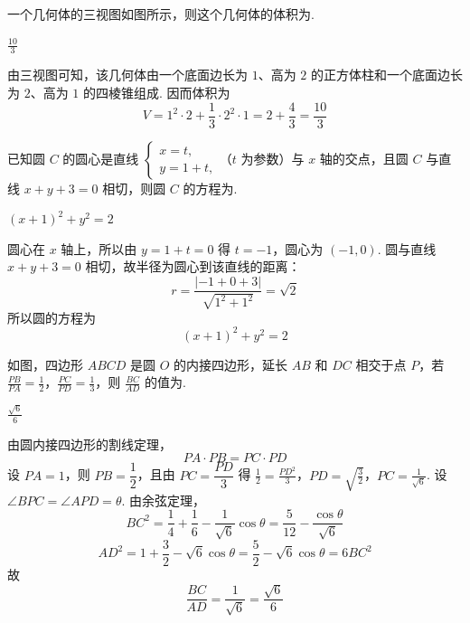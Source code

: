 \begin{problem}
一个几何体的三视图如图所示，则这个几何体的体积为\fillinblank{}.

\begin{answer}
\(\frac{10}{3}\)
\end{answer}
\begin{solution}
由三视图可知，该几何体由一个底面边长为 \(1\)、高为 \(2\) 的正方体柱和一个底面边长为 \(2\)、高为 \(1\) 的四棱锥组成. 因而体积为
\[
V=1^2\cdot2+\frac13\cdot2^2\cdot1
=2+\frac43=\frac{10}{3}
\]
\end{solution}
\end{problem}

\begin{problem}
已知圆 \(C\) 的圆心是直线 \(\begin{cases}
x = t,\\
y = 1 + t,
\end{cases}\)（\(t\) 为参数）与 \(x\) 轴的交点，且圆 \(C\) 与直线 \(x + y + 3 = 0\) 相切，则圆 \(C\) 的方程为\fillinblank{}.
\begin{answer}
\(\left(x+1\right)^2+y^2=2\)
\end{answer}
\begin{solution}
圆心在 \(x\) 轴上，所以由 \(y=1+t=0\) 得 \(t=-1\)，圆心为 \((-1,0)\). 圆与直线 \(x+y+3=0\) 相切，故半径为圆心到该直线的距离：
\[
r=\frac{|-1+0+3|}{\sqrt{1^2+1^2}}=\sqrt2
\]
所以圆的方程为
\[
(x+1)^2+y^2=2
\]
\end{solution}
\end{problem}

\begin{problem}
如图，四边形 \(ABCD\) 是圆 \(O\) 的内接四边形，延长 \(AB\) 和 \(DC\) 相交于点 \(P\)，若 \(\frac{PB}{PA} = \frac{1}{2}\)，\(\frac{PC}{PD} = \frac{1}{3}\)，则 \(\frac{BC}{AD}\) 的值为\fillinblank{}.

\begin{answer}
\(\frac{\sqrt{6}}{6}\)
\end{answer}
\begin{solution}
由圆内接四边形的割线定理，
\[
PA\cdot PB=PC\cdot PD
\]
设 \(PA=1\)，则 \(PB=\dfrac12\)，且由 \(PC=\dfrac{PD}{3}\) 得
\(\frac12=\frac{PD^2}{3}\)，\(PD=\sqrt{\frac32}\)，\(PC=\frac1{\sqrt6}\).
设 \(\angle BPC=\angle APD=\theta\). 由余弦定理，
\[
BC^2=\frac14+\frac16-\frac1{\sqrt6}\cos\theta
=\frac5{12}-\frac{\cos\theta}{\sqrt6}
\]
\[
AD^2=1+\frac32-\sqrt6\cos\theta
=\frac52-\sqrt6\cos\theta=6BC^2
\]
故
\[
\frac{BC}{AD}=\frac1{\sqrt6}=\frac{\sqrt6}{6}
\]
\end{solution}
\end{problem}

